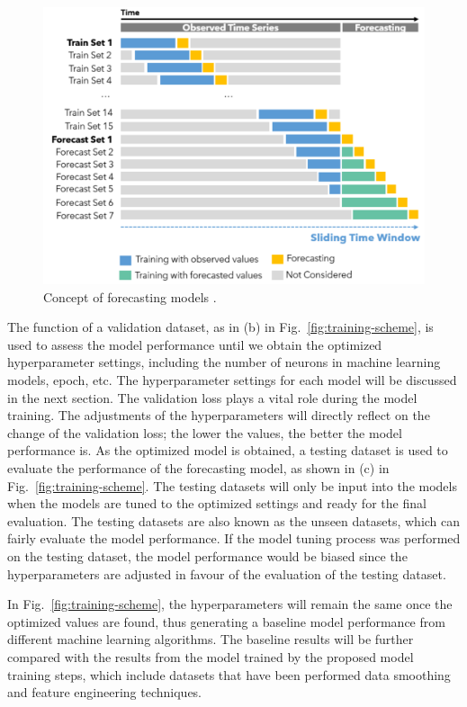 \begin{figure}[!ht]
  \centering
  \includegraphics[width=0.9\columnwidth]{imgs/forecast-concept.png}
  \caption{Concept of forecasting models \citep{liuTimeSeriesForecasting2020}.}
  \label{fig:forecast-concept}
\end{figure}

The function of a validation dataset, as in (b) in Fig.~\ref{fig:training-scheme}, is used to assess the model performance until we obtain the optimized hyperparameter settings, including the number of neurons in machine learning models, epoch, etc. The hyperparameter settings for each model will be discussed in the next section. The validation loss plays a vital role during the model training. The adjustments of the hyperparameters will directly reflect on the change of the validation loss; the lower the values, the better the model performance is. As the optimized model is obtained, a testing dataset is used to evaluate the performance of the forecasting model, as shown in (c) in Fig.~\ref{fig:training-scheme}. The testing datasets will only be input into the models when the models are tuned to the optimized settings and ready for the final evaluation. The testing datasets are also known as the unseen datasets, which can fairly evaluate the model performance. If the model tuning process was performed on the testing dataset, the model performance would be biased since the hyperparameters are adjusted in favour of the evaluation of the testing dataset.

In Fig.~\ref{fig:training-scheme}, the hyperparameters will remain the same once the optimized values are found, thus generating a baseline model performance from different machine learning algorithms. The baseline results will be further compared with the results from the model trained by the proposed model training steps, which include datasets that have been performed data smoothing and feature engineering techniques.

